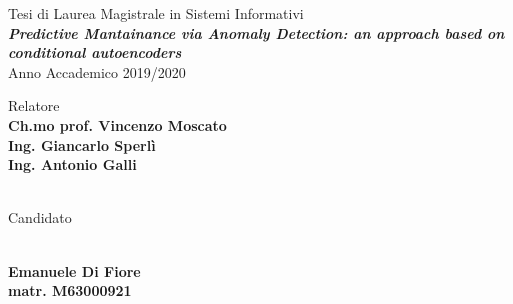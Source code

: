 \begin{titlepage}
\thispagestyle{empty}
\raggedright %


\vfill

{\large Tesi di Laurea Magistrale in Sistemi Informativi}
\\[1cm]
{\textbf{\textit{\LARGE Predictive Mantainance via Anomaly Detection: an approach based on conditional autoencoders}}}
\\[1cm]
{\large Anno Accademico 2019/2020}

\vfill


\begin{table}[h]
Relatore
\\
\textbf{Ch.mo prof. Vincenzo Moscato}
\\
\textbf{Ing. Giancarlo Sperlì}
\\
\textbf{Ing. Antonio Galli}
\\ \\
{\raggedright Candidato}
\\
\textbf{Emanuele Di Fiore}
\\
\textbf{matr. M63000921}
\end{table}

\end{titlepage}